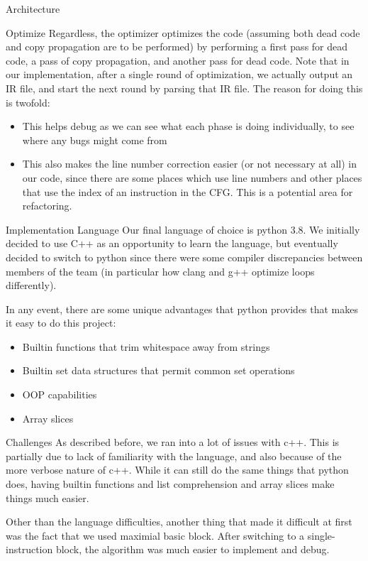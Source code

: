 \documentclass[letterpaper,12pt]{article}
\theoremstyle{definition}
\begin{document}
\begin{section}{Architecture}
\begin{subsection}{Optimize}
			Regardless, the optimizer optimizes the code (assuming both dead code and copy propagation are to be performed) by performing a first pass for dead code, a pass of copy propagation, and another pass for dead code. Note that in our implementation, after a single round of optimization, we actually output an IR file, and start the next round by parsing that IR file. The reason for doing this is twofold:
			\begin{itemize}
				\item This helps debug as we can see what each phase is doing individually, to see where any bugs might come from
				\item This also makes the line number correction easier (or not necessary at all) in our code, since there are some places which use line numbers and other places that use the index of an instruction in the CFG. This is a potential area for refactoring.
			\end{itemize}
		\end{subsection}
	\end{section}

	\begin{section}{Implementation Language}
		Our final language of choice is python 3.8. We initially decided to use C++ as an opportunity to learn the language, but eventually decided to switch to python since there were some compiler discrepancies between members of the team (in particular how clang and g++ optimize loops differently).

		In any event, there are some unique advantages that python provides that makes it easy to do this project:
		\begin{itemize}
			\item Builtin functions that trim whitespace away from strings
			\item Builtin set data structures that permit common set operations
			\item OOP capabilities
			\item Array slices
		\end{itemize}
	\end{section}

	\begin{section}{Challenges}
		As described before, we ran into a lot of issues with c++. This is partially due to lack of familiarity with the language, and also because of the more verbose nature of c++. While it can still do the same things that python does, having builtin functions and list comprehension and array slices make things much easier.

		Other than the language difficulties, another thing that made it difficult at first was the fact that we used maximial basic block. After switching to a single-instruction block, the algorithm was much easier to implement and debug.
	\end{section}
\end{document}
